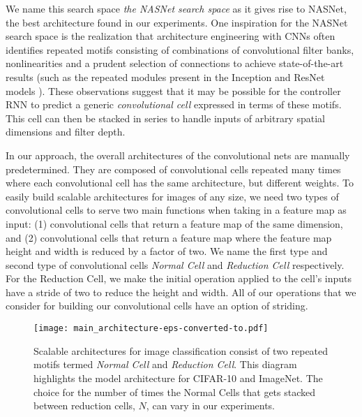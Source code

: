 \documentclass[10pt,twocolumn,letterpaper]{article}
\begin{document}
We name this search space \emph{the NASNet search space} as it gives rise to NASNet, the best architecture found in our experiments. One inspiration for the NASNet search space is the realization that architecture engineering with CNNs often identifies 
repeated motifs consisting of combinations of convolutional
filter banks, nonlinearities and a prudent selection of
connections to achieve state-of-the-art results (such as the repeated modules present in the Inception and ResNet models \cite{szegedy2015going,he2015deep,szegedy2016rethinking,szegedy2016inception}). These observations suggest that it may be possible for the controller RNN to predict a generic {\it convolutional cell} expressed in terms of these motifs. This cell can then be stacked in series to handle inputs of arbitrary spatial dimensions and filter depth. 

In our approach, the overall architectures of the convolutional nets are manually predetermined. They are composed of convolutional cells repeated many times where each convolutional cell has the same architecture, but different weights. To easily build scalable architectures for images of any size, we need two types of convolutional cells to serve two main functions when taking in a feature map as input: (1) convolutional cells that return a feature map of the same dimension,  and (2) convolutional cells that return a feature map where the feature map height and width is reduced by a factor of two. We name the first type and second type of convolutional cells  \emph{Normal Cell} and \emph{Reduction Cell} respectively. For the Reduction Cell, we make the initial operation applied to the cell's inputs have a stride of two to reduce the height and width. All of our operations that we consider for building our convolutional cells have an option of striding.

\begin{figure}[t!]
\begin{center}
\texttt{[image: main\_architecture-eps-converted-to.pdf]}
\caption{Scalable architectures for image classification consist of two repeated motifs termed {\it Normal Cell} and {\it Reduction Cell}. This diagram highlights the model architecture for CIFAR-10 and  ImageNet. The choice for the number of times the Normal Cells that gets stacked between reduction cells, $N$, can vary in our experiments.}
\label{figure:mainnet}
\end{center}
\end{figure}
\end{document}
